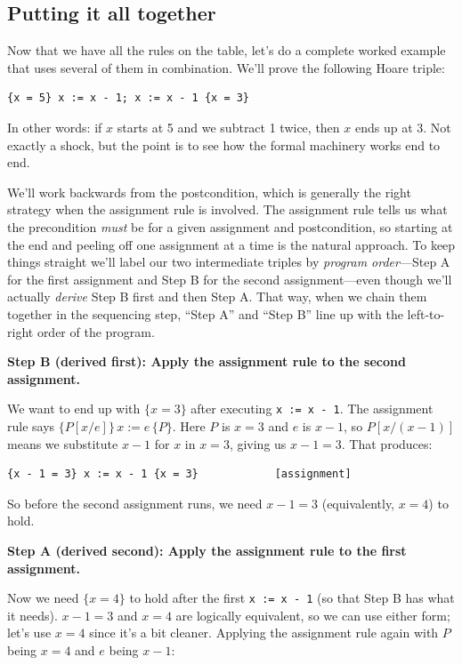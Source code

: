 \documentclass[11pt]{article}
\begin{document}
\subsection{Putting it all together}

Now that we have all the rules on the table, let's do a complete worked example that uses several of them in combination. We'll prove the following Hoare triple:

\begin{lstlisting}
{x = 5} x := x - 1; x := x - 1 {x = 3}
\end{lstlisting}

In other words: if $x$ starts at 5 and we subtract 1 twice, then $x$ ends up at 3. Not exactly a shock, but the point is to see how the formal machinery works end to end.

We'll work backwards from the postcondition, which is generally the right strategy when the assignment rule is involved. The assignment rule tells us what the precondition \emph{must} be for a given assignment and postcondition, so starting at the end and peeling off one assignment at a time is the natural approach. To keep things straight we'll label our two intermediate triples by \emph{program order}---Step A for the first assignment and Step B for the second assignment---even though we'll actually \emph{derive} Step B first and then Step A. That way, when we chain them together in the sequencing step, ``Step A'' and ``Step B'' line up with the left-to-right order of the program.

\medskip
\noindent\textbf{Step B (derived first): Apply the assignment rule to the second assignment.}

We want to end up with $\{x = 3\}$ after executing \texttt{x := x - 1}. The assignment rule says $\{P[x/e]\}\, x := e\, \{P\}$.
Here $P$ is $x = 3$ and $e$ is $x - 1$, so $P[x/(x-1)]$ means we substitute $x - 1$ for $x$ in $x = 3$, giving us $x - 1 = 3$. That produces:
\begin{lstlisting}
{x - 1 = 3} x := x - 1 {x = 3}            [assignment]
\end{lstlisting}

So before the second assignment runs, we need $x - 1 = 3$ (equivalently, $x = 4$) to hold.

\medskip
\noindent\textbf{Step A (derived second): Apply the assignment rule to the first assignment.}

Now we need $\{x = 4\}$ to hold after the first \texttt{x := x - 1} (so that Step B has what it needs). $x - 1 = 3$ and $x = 4$ are logically equivalent, so we can use either form; let's use $x = 4$ since it's a bit cleaner. Applying the assignment rule again with $P$ being $x = 4$ and $e$ being $x - 1$:
\end{document}
